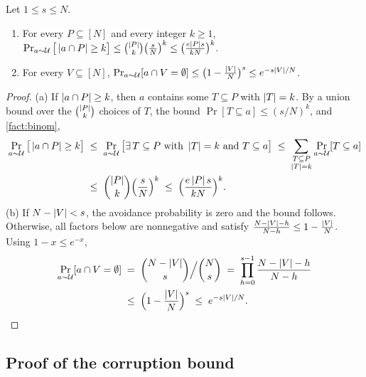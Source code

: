 \begin{claim}\label{clm:counting}
Let $1 \le s \le N$.
\begin{enumerate}[label=(\alph*)]
  \item For every $P \subseteq [N]$ and every integer $k \ge 1$, $\Pr_{a \sim \mathcal{U}} \big[\left|a \cap P\right| \ge k\big] \le \binom{\left|P\right|}{k}\big(\frac sN\big)^k \le \big(\frac{e\left|P\right|s}{kN}\big)^k$.
  \item For every $V \subseteq [N]$, $\Pr_{a \sim \mathcal{U}} [a \cap V = \emptyset] \le \big(1 - \frac{\left|V\right|}{N}\big)^s \le e^{-s\left|V\right|/N}$.
\end{enumerate}
\end{claim}
\begin{proof}
(a) If $\left|a \cap P\right| \ge k$, then $a$ contains some $T \subseteq P$ with $\left|T\right| = k$. By a union bound over the $\binom{\left|P\right|}{k}$ choices of $T$, the bound $\Pr[T \subseteq a] \le (s/N)^k$, and \cref{fact:binom},
\begin{align*}
\Pr_{a \sim \mathcal{U}}\big[\left|a \cap P\right| \ge k\big]
\;&\le\; \Pr_{a \sim \mathcal{U}}\big[\exists\, T \subseteq P \text{ with } \left|T\right| = k \text{ and } T \subseteq a\big]
\;\le\; \sum_{\substack{T \subseteq P \\ \left|T\right| = k}} \Pr_{a \sim \mathcal{U}}[T \subseteq a] \\
\;&\le\; \binom{\left|P\right|}{k}\Big(\frac sN\Big)^k \;\le\; \Big(\frac{e\left|P\right| s}{kN}\Big)^k.
\end{align*}
(b) If $N-\left|V\right|<s$, the avoidance probability is zero and the bound follows. Otherwise, all factors below are nonnegative and satisfy $\frac{N - \left|V\right| - h}{N-h} \le 1 - \frac{\left|V\right|}{N}$. Using $1-x\le e^{-x}$,
\begin{align*}
\Pr_{a \sim \mathcal{U}}[a \cap V = \emptyset]
\;&=\; \binom{N - \left|V\right|}{s}\Big/\binom Ns
\;=\; \prod_{h=0}^{s-1}\frac{N - \left|V\right| - h}{N-h} \\
\;&\le\; \Big(1 - \frac{\left|V\right|}{N}\Big)^s \;\le\; e^{-s\left|V\right|/N}.
\end{align*}

\end{proof}

\subsection{Proof of the corruption bound}\label{sec:bfs}

